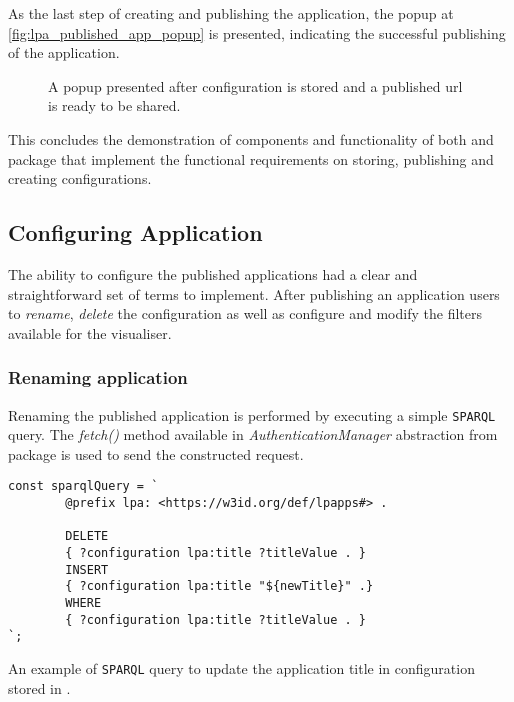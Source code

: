 As the last step of creating and publishing the \lpa{} application, the popup at \autoref{fig:lpa_published_app_popup} is presented, indicating the successful publishing of the application. 

\begin{figure}[h]
\centering
{}
\caption{A popup presented after configuration is stored and a published url is ready to be shared.}
\label{fig:lpa_published_app_popup}
\end{figure}

This concludes the demonstration of components and functionality of both \lpa{} and \lpas{} package that implement the functional requirements on storing, publishing and creating \lpa{} configurations. 

\subsection{Configuring Application}

The ability to configure the published applications had a clear and straightforward set of terms to implement. After publishing an application \lpa{} users  to \textit{rename}, \textit{delete} the configuration as well as configure and modify the filters available for the visualiser.

\subsubsection{Renaming application}

Renaming the published application is performed by executing a simple \texttt{SPARQL} query. The \textit{fetch()} method available in \textit{AuthenticationManager} abstraction from \lpas{} package is used to send the constructed request. 

\begin{listing}[H]    
\begin{verbatim}
const sparqlQuery = `
        @prefix lpa: <https://w3id.org/def/lpapps#> .

        DELETE
        { ?configuration lpa:title ?titleValue . }
        INSERT
        { ?configuration lpa:title "${newTitle}" .}
        WHERE
        { ?configuration lpa:title ?titleValue . }
`;
\end{verbatim}
\caption{An example of \texttt{SPARQL} query to update the application title in configuration stored in \solid{}.} 
\label{lst:lpapp_sample_rename_app_sparql}
\end{listing}

